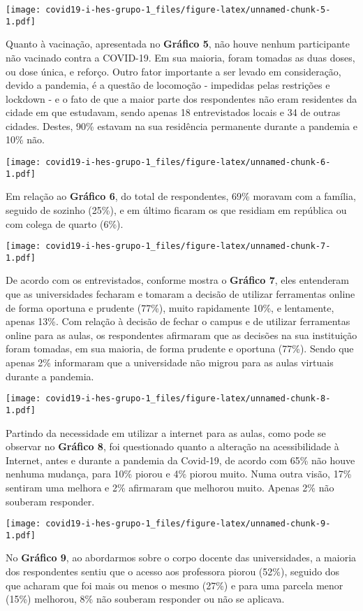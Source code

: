 \documentclass[
]{article}
\begin{document}
\texttt{[image: covid19-i-hes-grupo-1\_files/figure-latex/unnamed-chunk-5-1.pdf]}

Quanto à vacinação, apresentada no \textbf{Gráfico 5}, não houve nenhum
participante não vacinado contra a COVID-19. Em sua maioria, foram
tomadas as duas doses, ou dose única, e reforço. Outro fator importante
a ser levado em consideração, devido a pandemia, é a questão de
locomoção - impedidas pelas restrições e lockdown - e o fato de que a
maior parte dos respondentes não eram residentes da cidade em que
estudavam, sendo apenas 18 entrevistados locais e 34 de outras cidades.
Destes, 90\% estavam na sua residência permanente durante a pandemia e
10\% não.

\texttt{[image: covid19-i-hes-grupo-1\_files/figure-latex/unnamed-chunk-6-1.pdf]}

Em relação ao \textbf{Gráfico 6}, do total de respondentes, 69\% moravam
com a família, seguido de sozinho (25\%), e em último ficaram os que
residiam em república ou com colega de quarto (6\%).

\texttt{[image: covid19-i-hes-grupo-1\_files/figure-latex/unnamed-chunk-7-1.pdf]}

De acordo com os entrevistados, conforme mostra o \textbf{Gráfico 7},
eles entenderam que as universidades fecharam e tomaram a decisão de
utilizar ferramentas online de forma oportuna e prudente (77\%), muito
rapidamente 10\%, e lentamente, apenas 13\%. Com relação à decisão de
fechar o campus e de utilizar ferramentas online para as aulas, os
respondentes afirmaram que as decisões na sua instituição foram tomadas,
em sua maioria, de forma prudente e oportuna (77\%). Sendo que apenas
2\% informaram que a universidade não migrou para as aulas virtuais
durante a pandemia.

\texttt{[image: covid19-i-hes-grupo-1\_files/figure-latex/unnamed-chunk-8-1.pdf]}

Partindo da necessidade em utilizar a internet para as aulas, como pode
se observar no \textbf{Gráfico 8}, foi questionado quanto a alteração na
acessibilidade à Internet, antes e durante a pandemia da Covid-19, de
acordo com 65\% não houve nenhuma mudança, para 10\% piorou e 4\% piorou
muito. Numa outra visão, 17\% sentiram uma melhora e 2\% afirmaram que
melhorou muito. Apenas 2\% não souberam responder.

\texttt{[image: covid19-i-hes-grupo-1\_files/figure-latex/unnamed-chunk-9-1.pdf]}

No \textbf{Gráfico 9}, ao abordarmos sobre o corpo docente das
universidades, a maioria dos respondentes sentiu que o acesso aos
professora piorou (52\%), seguido dos que acharam que foi mais ou menos
o mesmo (27\%) e para uma parcela menor (15\%) melhorou, 8\% não
souberam responder ou não se aplicava.
\end{document}
